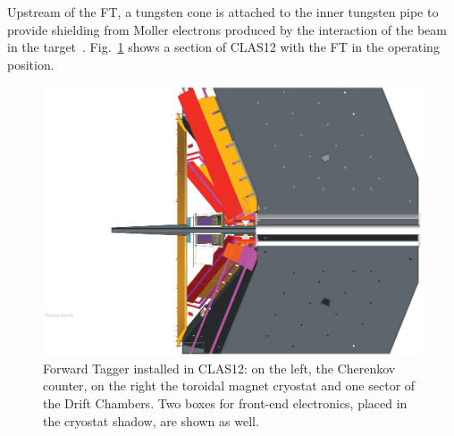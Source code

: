 Upstream of the FT, a tungsten cone is attached to the inner tungsten pipe to provide shielding from Moller electrons produced by the interaction of the beam in the target~\cite{beamline}. Fig.~\ref{fig:integra} shows a section of CLAS12 with the FT in the operating position.

\begin{figure}
\includegraphics[width=1.0\columnwidth]{./fig/IC_integra.eps}
\caption{Forward Tagger installed in CLAS12: on the left, the Cherenkov counter, on the right the toroidal magnet cryostat and one sector of the Drift Chambers. Two boxes for front-end electronics, placed in the cryostat shadow, are shown as well.}
\label{fig:integra}
\end{figure}







